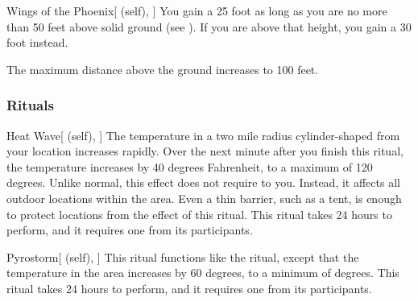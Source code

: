 \lowercase{\hypertarget{spell:Wings of the Phoenix}{}}\label{spell:Wings of the Phoenix}
\begin{attuneability}[Rank 5]{\hypertarget{spell:Wings of the Phoenix}{Wings of the Phoenix}}[ (self), ]
You gain a 25 foot  as long as you are no more than 50 feet above solid ground (see ).
If you are above that height, you gain a 30 foot  instead.

\rankline
{} The maximum distance above the ground increases to 100 feet.

\end{attuneability}
\vspace{0.25em}



\subsubsection{Rituals}


\lowercase{\hypertarget{spell:Heat Wave}{}}\label{spell:Heat Wave}
\begin{attuneability}[Rank 4]{\hypertarget{spell:Heat Wave}{Heat Wave}}[ (self), ]
\targetrule
The temperature in a two mile radius cylinder-shaped  from your location increases rapidly.
Over the next minute after you finish this ritual, the temperature increases by 40 degrees Fahrenheit, to a maximum of 120 degrees.
Unlike normal, this effect does not require  to you.
Instead, it affects all outdoor locations within the area.
Even a thin barrier, such as a tent, is enough to protect locations from the effect of this ritual.
This ritual takes 24 hours to perform, and it requires one  from its participants.
\end{attuneability}
\vspace{0.25em}



\lowercase{\hypertarget{spell:Pyrostorm}{}}\label{spell:Pyrostorm}
\begin{attuneability}[Rank 8]{\hypertarget{spell:Pyrostorm}{Pyrostorm}}[ (self), ]
\targetrule
This ritual functions like the  ritual, except that the temperature in the area increases by 60 degrees, to a minimum of  degrees.
This ritual takes 24 hours to perform, and it requires one  from its participants.
\end{attuneability}
\vspace{0.25em}


